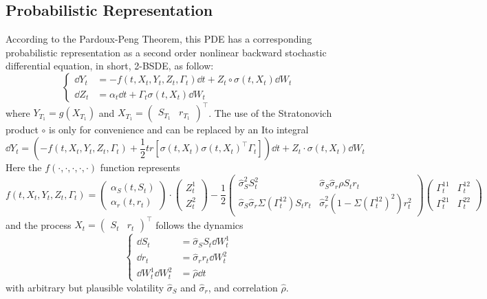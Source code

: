 \documentclass[11pt]{article}
\numberwithin{equation}{section}
\theoremstyle{remark}
\begin{document}
\subsection{Probabilistic Representation}\label{5.4}
According to the Pardoux-Peng Theorem, this PDE has a corresponding probabilistic representation as a second order nonlinear backward stochastic differential equation, in short, 2-BSDE, as follow:
$$
\left\{
\begin{array}{ll}
\dd Y_t & = -f(t, X_t, Y_t, Z_t, \Gamma_t) \dd t + Z_t \circ \sigma(t, X_t) \dd W_t\\
\dd Z_t & = \alpha_t \dd t + \Gamma_t \sigma(t, X_t) \dd W_t
\end{array}
\right.
$$
where $Y_{T_1} = g(X_{T_1})$ and $X_{T_1} = \begin{pmatrix} S_{T_1} & r_{T_1} \end{pmatrix}^\top$. The use of the Stratonovich product $\circ$ is only for convenience and can be replaced by an Ito integral
$$\dd Y_t  = \left( -f(t, X_t, Y_t, Z_t, \Gamma_t) + \frac{1}{2} tr \left[\sigma(t,X_t)\sigma(t,X_t)^\top \Gamma_{t} \right] \right) \dd t + Z_t \cdot \sigma(t, X_t) \dd W_t$$
Here the $f(\cdot, \cdot, \cdot, \cdot, \cdot)$ function represents
$$f(t, X_t,Y_t,Z_t,\Gamma_t) = \begin{pmatrix}\alpha_S(t, S_t) \\ \alpha_r(t,r_t) \end{pmatrix} \cdot \begin{pmatrix} Z_t^1\\ Z_t^2 \end{pmatrix} - \frac{1}{2} \begin{pmatrix}\hat{\sigma}_S^2S_t^2 & \hat{\sigma}_S \hat{\sigma}_r \rho S_t r_t \\ \hat{\sigma}_S \hat{\sigma}_r \Sigma(\Gamma_t^{12}) S_t r_t & \hat{\sigma}_r^2(1-\Sigma(\Gamma_t^{12})^2) r_t^2 \end{pmatrix} \begin{pmatrix}\Gamma_t^{11}& \Gamma_t^{12} \\ \Gamma_t^{21} & \Gamma_t^{22} \end{pmatrix}$$
and the process $X_t = \begin{pmatrix} S_t & r_t \end{pmatrix}^\top$ follows the dynamics
$$
\left\{
\begin{array}{ll}
\dd S_t & = \hat\sigma_S S_t \dd W_t^1\\
\dd r_t & = \hat\sigma_r r_t \dd W_t^2\\
\dd W_t^1 \dd W_t^2 & = \hat\rho \dd t
\end{array}
\right.
$$
with arbitrary but plausible volatility $\hat\sigma_S$ and $\hat\sigma_r$, and correlation $\hat\rho$.
\end{document}
